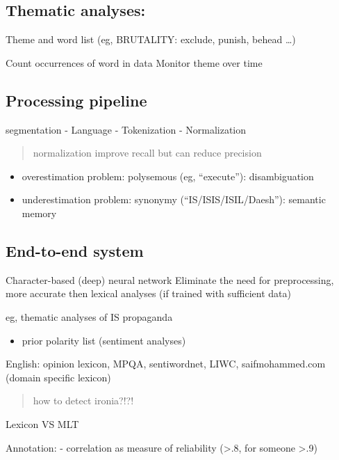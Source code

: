\documentclass[]{book}
\providecommand{\tightlist}{%
  \setlength{\itemsep}{0pt}\setlength{\parskip}{0pt}}
\theoremstyle{definition}
\theoremstyle{definition}
\theoremstyle{definition}
\theoremstyle{remark}
\begin{document}
\subsection{Thematic analyses:}\label{thematic-analyses}

Theme and word list (eg, BRUTALITY: exclude, punish, behead \ldots{})

Count occurrences of word in data Monitor theme over time

\subsection{Processing pipeline}\label{processing-pipeline}

segmentation - Language - Tokenization - Normalization

\begin{quote}
normalization improve recall but can reduce precision
\end{quote}

\begin{itemize}
\tightlist
\item
  overestimation problem: polysemous (eg, ``execute''): disambiguation
\item
  underestimation problem: synonymy (``IS/ISIS/ISIL/Daesh''): semantic
  memory
\end{itemize}

\subsection{End-to-end system}\label{end-to-end-system}

Character-based (deep) neural network Eliminate the need for
preprocessing, more accurate then lexical analyses (if trained with
sufficient data)

eg, thematic analyses of IS propaganda

\begin{itemize}
\tightlist
\item
  prior polarity list (sentiment analyses)
\end{itemize}

English: opinion lexicon, MPQA, sentiwordnet, LIWC, saifmohammed.com
(domain specific lexicon)

\begin{quote}
how to detect ironia?!?!
\end{quote}

Lexicon VS MLT

Annotation: - correlation as measure of reliability (\textgreater{}.8,
for someone \textgreater{}.9)
\end{document}
